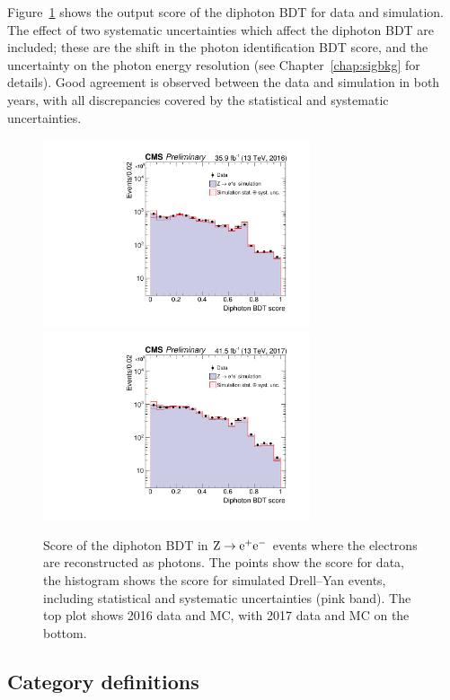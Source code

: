 Figure~\ref{fig:cat_diphoBDT} shows the output score of the diphoton BDT for data and simulation.
The effect of two systematic uncertainties which affect the diphoton BDT are included;
these are the shift in the photon identification BDT score, 
and the uncertainty on the photon energy resolution (see Chapter~\ref{chap:sigbkg} for details).
Good agreement is observed between the data and simulation in both years, 
with all discrepancies covered by the statistical and systematic uncertainties.

\begin{figure}[hptb]
\centering
\includegraphics[width=0.7\textwidth]{Figures/Categorisation/DiphoBDT_2016.pdf}
\includegraphics[width=0.7\textwidth]{Figures/Categorisation/DiphoBDT_2017.pdf}
\caption{
  Score of the diphoton BDT in $\mathrm{Z}\rightarrow{\mathrm{e}^{+}\mathrm{e}^{-}}$
  events where the electrons are reconstructed as photons.
  The points show the score for data, the histogram shows
  the score for simulated Drell--Yan events, including statistical and 
  systematic uncertainties (pink band).
  The top plot shows 2016 data and MC,
  with 2017 data and MC on the bottom.
}
\label{fig:cat_diphoBDT}
\end{figure}

\subsection{Category definitions}

